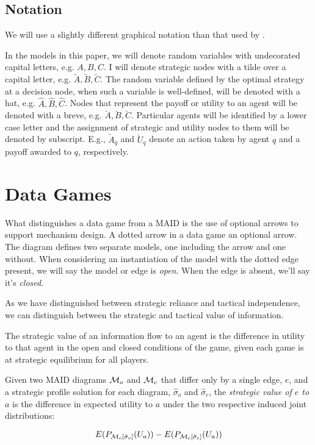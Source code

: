 \documentclass[../thesis.tex]{subfiles}
\begin{document}

\subsection{Notation}
\label{sec:maid-notation}

We will use a slightly different graphical notation than that used by
\citet{koller2003multi}.

In the models in this paper, we will denote random variables
with undecorated capital letters, e.g. $A, B, C$.
I will denote strategic nodes with a tilde over a capital
letter, e.g. $\tilde{A}, \tilde{B}, \tilde{C}$.
The random variable defined by the optimal strategy at a
decision node, when such a variable is well-defined,
will be denoted with a hat, e.g. $\hat{A}, \hat{B}, \hat{C}$.
Nodes that represent the payoff or utility to an
agent will be denoted with a breve, e.g.
$\breve{A}, \breve{B}, \breve{C}$.
Particular agents will be identified by a lower case
letter and the assignment of strategic and utility nodes
to them will be denoted by subscript.
E.g., $\tilde{A}_q$ and $\breve{U}_q$ denote an action
taken by agent $q$ and a payoff awarded to $q$,
respectively.

\section{Data Games}
\label{sec:value-of-data}

What distinguishes a data game from a MAID is the use
of optional arrows to support mechanism design.
A dotted arrow in a data game an optional arrow.
The diagram defines two separate models, one including the
arrow and one without.
When considering an instantiation of the model with the dotted
edge present, we will say the model or edge is \emph{open}.
When the edge is absent, we'll say it's \emph{closed}.

As we have distinguished between strategic reliance and
tactical independence, we can distinguish between the
strategic and tactical value of information.

The strategic value of an information flow to an agent
is the difference in utility to that agent in the open
and closed conditions of the game, given each game
is at strategic equilibrium for all players.

\begin{dfn}
  \label{dfn:strategic-value}
  Given two MAID diagrams $\mathcal{M}_{o}$ and $\mathcal{M}_{c}$
  that differ only by a single edge, $e$,
  and a strategic profile solution for each diagram, $\hat{\sigma}_{o}$
  and $\hat{\sigma}_{c}$, the \emph{strategic value of $e$ to $a$}
  is the difference in expected utility to $a$ under the
  two respective induced joint distributions:

  $$E(P_{\mathcal{M}_{o}[\hat{\sigma}_{o}]}(U_a)) - E(P_{\mathcal{M}_{c}[\hat{\sigma}_{c}]}(U_a))$$
\end{dfn}
\end{document}
